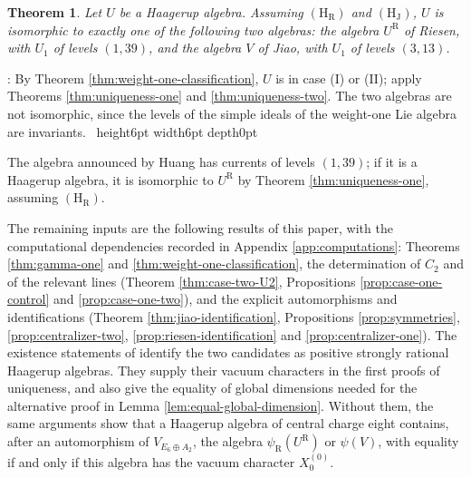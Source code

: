 \documentclass[leqno]{article}
\newcommand{\qed}{\hfill \vrule height6pt  width6pt depth0pt}
\newtheorem{thm}{Theorem}[section]
\newenvironment{proof}[1][]{\noindent {\it Proof #1} : }{\hbox{~}\qed
\smallskip
}
\numberwithin{equation}{section}
\begin{document}
\begin{thm}
\label{thm:classification}
Let $U$ be a Haagerup algebra. Assuming $\mathrm{(H_R)}$ and $\mathrm{(H_J)}$, $U$ is isomorphic to exactly one of the following two algebras: the algebra $U^{\mathrm R}$ of Riesen, with $U_1$ of levels $(1,39)$, and the algebra $V$ of Jiao, with $U_1$ of levels $(3,13)$.
\end{thm}

\begin{proof}
By Theorem \ref{thm:weight-one-classification}, $U$ is in case (I) or (II); apply Theorems \ref{thm:uniqueness-one} and \ref{thm:uniqueness-two}. The two algebras are not isomorphic, since the levels of the simple ideals of the weight-one Lie algebra are invariants.
\end{proof}

The algebra announced by Huang \cite{Hua26} has currents of levels $(1,39)$; if it is a Haagerup algebra, it is isomorphic to $U^{\mathrm R}$ by Theorem \ref{thm:uniqueness-one}, assuming $\mathrm{(H_R)}$.

The remaining inputs are the following results of this paper, with the computational dependencies recorded in Appendix \ref{app:computations}: Theorems \ref{thm:gamma-one} and \ref{thm:weight-one-classification}, the determination of $C_2$ and of the relevant lines (Theorem \ref{thm:case-two-U2}, Propositions \ref{prop:case-one-control} and \ref{prop:case-one-two}), and the explicit automorphisms and identifications (Theorem \ref{thm:jiao-identification}, Propositions \ref{prop:symmetries}, \ref{prop:centralizer-two}, \ref{prop:riesen-identification} and \ref{prop:centralizer-one}). The existence statements of \cite{Rie26,Jia26} identify the two candidates as positive strongly rational Haagerup algebras. They supply their vacuum characters in the first proofs of uniqueness, and also give the equality of global dimensions needed for the alternative proof in Lemma \ref{lem:equal-global-dimension}. Without them, the same arguments show that a Haagerup algebra of central charge eight contains, after an automorphism of $V_{E_6 \oplus A_2}$, the algebra $\psi_{\mathrm R}(U^{\mathrm R})$ or $\psi(V)$, with equality if and only if this algebra has the vacuum character $X^{(0)}_0$.
\end{document}
